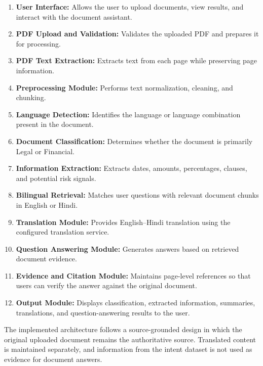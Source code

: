 \begin{enumerate}
    \item \textbf{User Interface:} Allows the user to upload documents,
    view results, and interact with the document assistant.

    \item \textbf{PDF Upload and Validation:} Validates the uploaded
    PDF and prepares it for processing.

    \item \textbf{PDF Text Extraction:} Extracts text from each page
    while preserving page information.

    \item \textbf{Preprocessing Module:} Performs text normalization,
    cleaning, and chunking.

    \item \textbf{Language Detection:} Identifies the language or
    language combination present in the document.

    \item \textbf{Document Classification:} Determines whether the
    document is primarily Legal or Financial.

    \item \textbf{Information Extraction:} Extracts dates, amounts,
    percentages, clauses, and potential risk signals.

    \item \textbf{Bilingual Retrieval:} Matches user questions with
    relevant document chunks in English or Hindi.

    \item \textbf{Translation Module:} Provides English--Hindi
    translation using the configured translation service.

    \item \textbf{Question Answering Module:} Generates answers based
    on retrieved document evidence.

    \item \textbf{Evidence and Citation Module:} Maintains page-level
    references so that users can verify the answer against the
    original document.

    \item \textbf{Output Module:} Displays classification, extracted
    information, summaries, translations, and question-answering
    results to the user.
\end{enumerate}

The implemented architecture follows a source-grounded design in
which the original uploaded document remains the authoritative source.
Translated content is maintained separately, and information from the
intent dataset is not used as evidence for document answers.

